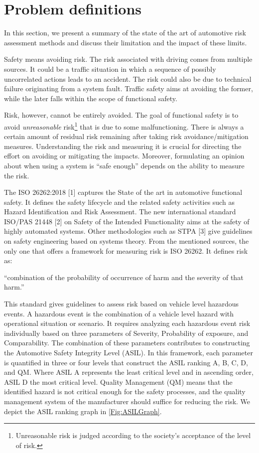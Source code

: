 \section{Problem definitions}
\label{sec:problem} %

In this section, we present a summary of the state of the art of automotive risk assessment methods and discuss their limitation and the impact of these limits. 

Safety means avoiding risk. The risk associated with driving comes from multiple sources. It could be a traffic situation in which a sequence of possibly uncorrelated actions leads to an accident. The risk could also be due to technical failure originating from a system fault. Traffic safety aims at avoiding the former, while the later falls within the scope of functional safety. 

Risk, however, cannot be entirely avoided. The goal of functional safety is to avoid \emph{unreasonable} risk\footnote{Unreasonable risk is judged according to the society's acceptance of the level of risk.} that is due to some malfunctioning. There is always a certain amount of residual risk remaining after taking risk avoidance/mitigation measures. Understanding the risk and measuring it is crucial for directing the effort on avoiding or mitigating the impacts. Moreover, formulating an opinion about when using a system is ``safe enough'' depends on the ability to measure the risk. 

The ISO 26262:2018 [1] captures the State of the art in automotive functional safety. It defines the safety lifecycle and the related safety activities such as Hazard Identification and Risk Assessment. The new international standard ISO/PAS 21448 [2] on Safety of the Intended Functionality aims at the safety of highly automated systems. Other methodologies such as STPA [3] give guidelines on safety engineering based on systems theory. 
From the mentioned sources, the only one that offers a framework for measuring risk is ISO 26262. It defines risk as:
\begin{definition}
	``combination of the probability of occurrence of harm and the severity of that harm.'' 
\end{definition}

This standard gives guidelines to assess risk based on vehicle level hazardous events. A hazardous event is the combination of a vehicle level hazard with operational situation or scenario. It requires analyzing each hazardous event risk individually based on three parameters of Severity, Probability of exposure, and Comparability. The combination of these parameters contributes to constructing the Automotive Safety Integrity Level (ASIL). In this framework, each parameter is quantified in three or four levels that construct the ASIL ranking A, B, C, D, and QM. Where ASIL A represents the least critical level and in ascending order, ASIL D the most critical level. Quality Management (QM) means that the identified hazard is not critical enough for the safety processes, and the quality management system of the manufacturer should suffice for reducing the risk. We depict the ASIL ranking graph in \cref{Fig:ASILGraph}. 

